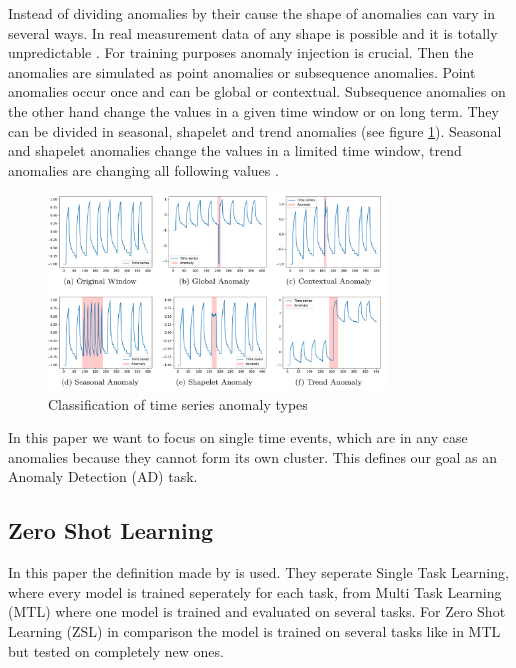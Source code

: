 Instead of dividing anomalies by their cause the shape of anomalies can vary in several ways. In real measurement data of any shape is possible and it is totally unpredictable \cite{schwartz_maeday_2024}. For training purposes anomaly injection is crucial. Then the anomalies are simulated as point anomalies or subsequence anomalies. Point anomalies occur once and can be global or contextual. Subsequence anomalies on the other hand change the values in a given time window or on long term. They can be divided in seasonal, shapelet and trend anomalies (see figure \ref{fig_anomaly_carla}). Seasonal and shapelet anomalies change the values in a limited time window, trend anomalies are changing all following values \cite[p. 9]{darban_carla_2024}. %
\begin{figure}[h!] %
  \centering
  \includegraphics[width=0.8\textwidth]{images/carla_anomalies.png}
  \caption{Classification of time series anomaly types \cite{darban_carla_2024}}
  \label{fig_anomaly_carla}
\end{figure}

In this paper we want to focus on single time events, which are in any case anomalies because they cannot form its own cluster. This defines our goal as an Anomaly Detection (AD) task.
\subsection{Zero Shot Learning}
In this paper the definition made by \cite{nivarthi_unified_2022} is used. They seperate Single Task Learning, where every model is trained seperately for each task, from Multi Task Learning (MTL) where one model is trained and evaluated on several tasks. For Zero Shot Learning (ZSL) in comparison the model is trained on several tasks like in MTL but tested on completely new ones.

